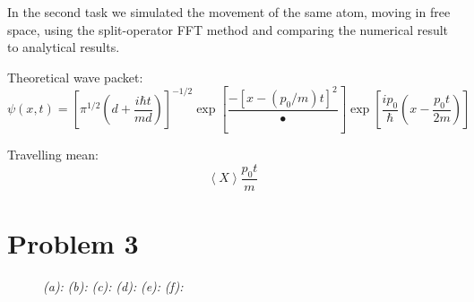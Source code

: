 In the second task we simulated the movement of the same atom, moving in free space, using the split-operator FFT method and comparing the numerical result to analytical results.

Theoretical wave packet:
\begin{equation}
\psi(x,t) = \left[
\pi^{1/2}\left(
d+\frac{i\hbar t}{md}
\right)
\right]^{-1/2}
\exp\left[
\frac{-\left[x-\left(p_0/m\right)t\right]^2}{•}
\right]
\exp\left[
\frac{ip_0}{\hbar}\left(x-\frac{p_0t}{2m}\right)
\right]
\end{equation}

Travelling mean:
\begin{equation}
\left<X\right>\frac{p_0t}{m}
\end{equation}



\section*{Problem 3}

\begin{figure}

\centering
\begin{subfigure}[t]{0.47\textwidth}
	\caption{}
	\label{fig:3_a}
\end{subfigure}
\begin{subfigure}[t]{0.47\textwidth}
	\caption{}
	\label{fig:3_b}
\end{subfigure}

\begin{subfigure}[t]{0.47\textwidth}
	\caption{}
	\label{fig:3_c}
\end{subfigure}
\begin{subfigure}[t]{0.47\textwidth}
	\caption{}
	\label{fig:3_d}
\end{subfigure}

\begin{subfigure}[t]{0.47\textwidth}
	\caption{}
	\label{fig:3_e}
\end{subfigure}
\begin{subfigure}[t]{0.47\textwidth}
	\caption{}
	\label{fig:3_f}
\end{subfigure}

\caption{
	\textit{(a):} 
	\textit{(b):} 
	\textit{(c):} 
	\textit{(d):} 
	\textit{(e):} 
	\textit{(f):} 
}
\label{fig:3}
\end{figure}

